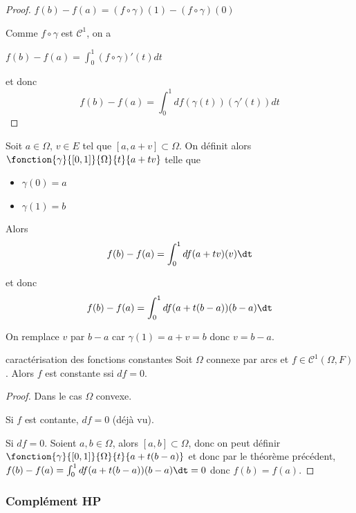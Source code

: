 \begin{proof}
    $f(b) - f(a) = (f \circ \gamma)(1) - (f \circ \gamma)(0)$

    Comme $f \circ \gamma$ est $\mathscr C^1$, on a 

    $f(b) - f(a) = \int_0^1 (f \circ \gamma)'(t) dt$

    et donc 
    $$f(b) - f(a) = \int_0^1 df(\gamma(t))(\gamma'(t)) dt$$
\end{proof}

\begin{proposition}{}{}
    Soit $a \in \Omega$, $v \in E$ tel que 
    $[a, a + v] \subset \Omega$. On définit alors 
    $\fonction{\gamma}{[0, 1]}{\Omega}{t}{a + t v}$ telle que 

    \begin{itemize}
        \item $\gamma(0) = a$
        \item $\gamma(1) = b$
    \end{itemize} Alors 
    $$f(b) - f(a) = \int_0^1 df(a + tv)(v) \dt$$

    et donc $$f(b) - f(a) = \int_0^1 df(a + t(b - a))(b - a) \dt$$
\end{proposition}

\begin{remarque}
    On remplace $v$ par $b - a$ car $\gamma(1) = a + v = b$ donc $v = b - a$.
\end{remarque}

\begin{corollaire}{}{caractérisation des fonctions constantes}{}
    Soit $\Omega$ connexe par arcs et $f \in \mathscr C^1(\Omega, F)$. Alors $f$ est 
    constante ssi $df = 0$. 
\end{corollaire}


\begin{proof}
    Dans le cas $\Omega$ convexe. 

    Si $f$ est contante, $df = 0$ (déjà vu).

    Si $df = 0$. Soient $a, b \in \Omega$, alors $[a, b] \subset \Omega$, 
    donc on peut définir \\
    $\fonction{\gamma}{[0, 1]}{\Omega}{t}{a + t(b - a)}$ et donc 
    par le théorème précédent,
    $f(b) - f(a) = \int_0^1 df(a + t(b - a))(b - a) \dt = 0$ donc $f(b) = f(a)$.
\end{proof}

\subsubsection{Complément HP}

